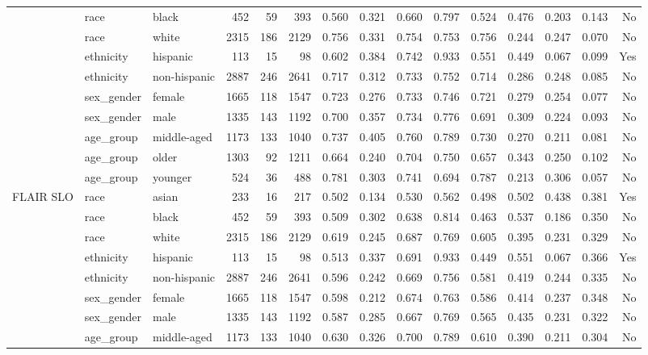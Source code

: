 \begin{longtable}{@{}lllrrrrrrrrrrrr@{}}
 & race & black & 452 & 59 & 393 & 0.560 & 0.321 & 0.660 & 0.797 & 0.524 & 0.476 & 0.203 & 0.143 & No \\
 & race & white & 2315 & 186 & 2129 & 0.756 & 0.331 & 0.754 & 0.753 & 0.756 & 0.244 & 0.247 & 0.070 & No \\
 & ethnicity & hispanic & 113 & 15 & 98 & 0.602 & 0.384 & 0.742 & 0.933 & 0.551 & 0.449 & 0.067 & 0.099 & Yes \\
 & ethnicity & non-hispanic & 2887 & 246 & 2641 & 0.717 & 0.312 & 0.733 & 0.752 & 0.714 & 0.286 & 0.248 & 0.085 & No \\
 & sex\_gender & female & 1665 & 118 & 1547 & 0.723 & 0.276 & 0.733 & 0.746 & 0.721 & 0.279 & 0.254 & 0.077 & No \\
 & sex\_gender & male & 1335 & 143 & 1192 & 0.700 & 0.357 & 0.734 & 0.776 & 0.691 & 0.309 & 0.224 & 0.093 & No \\
 & age\_group & middle-aged & 1173 & 133 & 1040 & 0.737 & 0.405 & 0.760 & 0.789 & 0.730 & 0.270 & 0.211 & 0.081 & No \\
 & age\_group & older & 1303 & 92 & 1211 & 0.664 & 0.240 & 0.704 & 0.750 & 0.657 & 0.343 & 0.250 & 0.102 & No \\
 & age\_group & younger & 524 & 36 & 488 & 0.781 & 0.303 & 0.741 & 0.694 & 0.787 & 0.213 & 0.306 & 0.057 & No \\
FLAIR SLO & race & asian & 233 & 16 & 217 & 0.502 & 0.134 & 0.530 & 0.562 & 0.498 & 0.502 & 0.438 & 0.381 & Yes \\
 & race & black & 452 & 59 & 393 & 0.509 & 0.302 & 0.638 & 0.814 & 0.463 & 0.537 & 0.186 & 0.350 & No \\
 & race & white & 2315 & 186 & 2129 & 0.619 & 0.245 & 0.687 & 0.769 & 0.605 & 0.395 & 0.231 & 0.329 & No \\
 & ethnicity & hispanic & 113 & 15 & 98 & 0.513 & 0.337 & 0.691 & 0.933 & 0.449 & 0.551 & 0.067 & 0.366 & Yes \\
 & ethnicity & non-hispanic & 2887 & 246 & 2641 & 0.596 & 0.242 & 0.669 & 0.756 & 0.581 & 0.419 & 0.244 & 0.335 & No \\
 & sex\_gender & female & 1665 & 118 & 1547 & 0.598 & 0.212 & 0.674 & 0.763 & 0.586 & 0.414 & 0.237 & 0.348 & No \\
 & sex\_gender & male & 1335 & 143 & 1192 & 0.587 & 0.285 & 0.667 & 0.769 & 0.565 & 0.435 & 0.231 & 0.322 & No \\
 & age\_group & middle-aged & 1173 & 133 & 1040 & 0.630 & 0.326 & 0.700 & 0.789 & 0.610 & 0.390 & 0.211 & 0.304 & No \\

\end{longtable}

